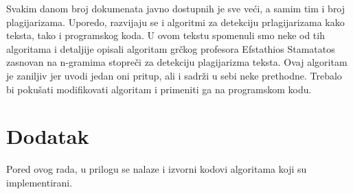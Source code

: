 \documentclass[a4paper]{article}
\begin{document}
Svakim danom broj dokumenata javno dostupnih je sve veći, a samim tim i broj plagijarizama. Uporedo, razvijaju se i algoritmi za detekciju prlagijarizama kako teksta, tako i programskog koda. U ovom tekstu spomenuli smo neke od tih algoritama i detaljije opisali algoritam grčkog profesora Efstathios Stamatatos zasnovan na n-gramima stopreči za detekciju plagijarizma teksta. Ovaj algoritam je zaniljiv jer uvodi jedan oni pritup, ali i sadrži u sebi neke prethodne. Trebalo bi pokušati modifikovati algoritam i primeniti ga na programskom kodu. 


\appendix
 


\appendix
\section{Dodatak}

Pored ovog rada, u prilogu se nalaze i izvorni kodovi algoritama koji su implementirani.
\end{document}

